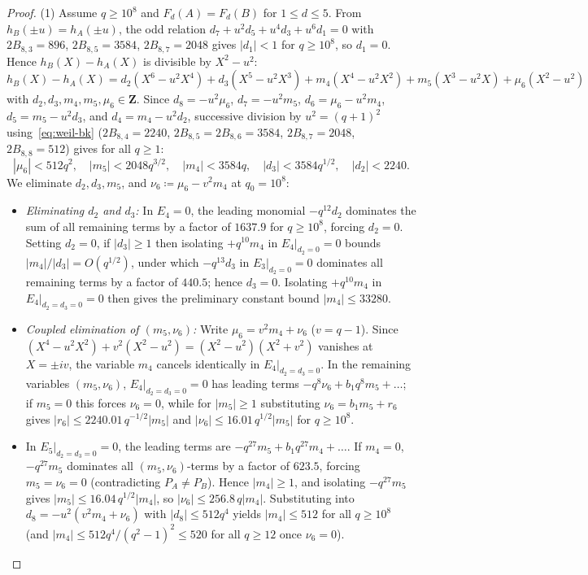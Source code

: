 \documentclass[11pt]{amsart}
\theoremstyle{remark}
\newcommand{\Z}{\mathbf{Z}}
\begin{document}
\begin{proof}
(1) Assume $q \ge 10^8$ and $F_d(A) = F_d(B)$ for $1 \le d \le 5$. From $h_B(\pm u) = h_A(\pm u)$, the odd relation $d_7 + u^2 d_5 + u^4 d_3 + u^6 d_1 = 0$ with $2 B_{8,3} = 896$, $2 B_{8,5} = 3584$, $2 B_{8,7} = 2048$ gives $|d_1| < 1$ for $q \ge 10^8$, so $d_1 = 0$. Hence $h_B(X) - h_A(X)$ is divisible by $X^2 - u^2$:
\[
h_B(X) - h_A(X) = d_2(X^6\! - u^2 X^4) + d_3(X^5\! - u^2 X^3) + m_4(X^4\! - u^2 X^2) + m_5(X^3\! - u^2 X) + \mu_6(X^2\! - u^2)
\]
with $d_2, d_3, m_4, m_5, \mu_6 \in \Z$. Since $d_8 = -u^2 \mu_6$, $d_7 = -u^2 m_5$, $d_6 = \mu_6 - u^2 m_4$, $d_5 = m_5 - u^2 d_3$, and $d_4 = m_4 - u^2 d_2$, successive division by $u^2 = (q + 1)^2$ using~\eqref{eq:weil-bk} ($2 B_{8,4} = 2240$, $2 B_{8,5} = 2 B_{8,6} = 3584$, $2 B_{8,7} = 2048$, $2 B_{8,8} = 512$) gives for all $q \ge 1$:
\[
|\mu_6| < 512 q^2, \quad |m_5| < 2048 q^{3/2}, \quad |m_4| < 3584 q, \quad |d_3| < 3584 q^{1/2}, \quad |d_2| < 2240.
\]
We eliminate $d_2, d_3, m_5$, and $\nu_6 \coloneqq \mu_6 - v^2 m_4$ at $q_0 = 10^8$:
\begin{itemize}
\item \emph{Eliminating $d_2$ and $d_3$:} In $E_4 = 0$, the leading monomial $-q^{12} d_2$ dominates the sum of all remaining terms by a factor of $1637.9$ for $q \ge 10^8$, forcing $d_2 = 0$. Setting $d_2 = 0$, if $|d_3| \ge 1$ then isolating $+q^{10} m_4$ in $E_4|_{d_2 = 0} = 0$ bounds $|m_4| / |d_3| = O(q^{1/2})$, under which $-q^{13} d_3$ in $E_3|_{d_2 = 0} = 0$ dominates all remaining terms by a factor of $440.5$; hence $d_3 = 0$. Isolating $+q^{10} m_4$ in $E_4|_{d_2 = d_3 = 0} = 0$ then gives the preliminary constant bound $|m_4| \le 33280$.
\item \emph{Coupled elimination of $(m_5, \nu_6)$:} Write $\mu_6 = v^2 m_4 + \nu_6$ ($v = q - 1$). Since $(X^4 - u^2 X^2) + v^2(X^2 - u^2) = (X^2 - u^2)(X^2 + v^2)$ vanishes at $X = \pm i v$, the variable $m_4$ cancels identically in $E_4|_{d_2 = d_3 = 0}$. In the remaining variables $(m_5, \nu_6)$, $E_4|_{d_2 = d_3 = 0} = 0$ has leading terms $-q^8 \nu_6 + b_1 q^8 m_5 + \dots$; if $m_5 = 0$ this forces $\nu_6 = 0$, while for $|m_5| \ge 1$ substituting $\nu_6 = b_1 m_5 + r_6$ gives $|r_6| \le 2240.01\, q^{-1/2} |m_5|$ and $|\nu_6| \le 16.01\, q^{1/2} |m_5|$ for $q \ge 10^8$.
\item In $E_5|_{d_2 = d_3 = 0} = 0$, the leading terms are $-q^{27} m_5 + b_1 q^{27} m_4 + \dots$. If $m_4 = 0$, $-q^{27} m_5$ dominates all $(m_5, \nu_6)$-terms by a factor of $623.5$, forcing $m_5 = \nu_6 = 0$ (contradicting $P_A \ne P_B$). Hence $|m_4| \ge 1$, and isolating $-q^{27} m_5$ gives $|m_5| \le 16.04\, q^{1/2} |m_4|$, so $|\nu_6| \le 256.8\, q |m_4|$. Substituting into $d_8 = -u^2(v^2 m_4 + \nu_6)$ with $|d_8| \le 512 q^4$ yields $|m_4| \le 512$ for all $q \ge 10^8$ (and $|m_4| \le 512 q^4 / (q^2 - 1)^2 \le 520$ for all $q \ge 12$ once $\nu_6 = 0$).

\end{itemize}
\end{proof}
\end{document}
